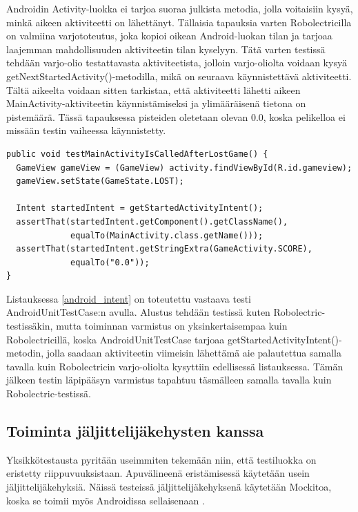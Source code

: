 Androidin Activity-luokka ei tarjoa suoraa julkista metodia, jolla voitaisiin kysyä, minkä aikeen aktiviteetti on lähettänyt. Tällaisia tapauksia varten Robolectricilla on valmiina varjototeutus, joka kopioi oikean Android-luokan tilan ja tarjoaa laajemman mahdollisuuden aktiviteetin tilan kyselyyn. Tätä varten testissä tehdään varjo-olio testattavasta aktiviteetista, jolloin varjo-oliolta voidaan kysyä getNextStartedActivity()-metodilla, mikä on seuraava käynnistettävä aktiviteetti. Tältä aikeelta voidaan sitten tarkistaa, että aktiviteetti lähetti aikeen MainActivity-aktiviteetin käynnistämiseksi ja ylimääräisenä tietona on pistemäärä. Tässä tapauksessa pisteiden oletetaan olevan 0.0, koska pelikelloa ei missään testin vaiheessa käynnistetty.

\begin{lstlisting}[float,label=android_intent,caption=Aikeen tilatietojen tarkastelu ActivityUnitTestCasen avulla]
public void testMainActivityIsCalledAfterLostGame() {
  GameView gameView = (GameView) activity.findViewById(R.id.gameview);
  gameView.setState(GameState.LOST);
  	
  Intent startedIntent = getStartedActivityIntent();
  assertThat(startedIntent.getComponent().getClassName(), 
             equalTo(MainActivity.class.getName()));
  assertThat(startedIntent.getStringExtra(GameActivity.SCORE), 
             equalTo("0.0"));
}
\end{lstlisting}

Listauksessa \ref{android_intent} on toteutettu vastaava testi AndroidUnitTestCase:n avulla. Alustus tehdään testissä kuten Robolectric-testissäkin, mutta toiminnan varmistus on yksinkertaisempaa kuin Robolectricillä, koska AndroidUnitTestCase tarjoaa getStartedActivityIntent()-metodin, jolla saadaan aktiviteetin viimeisin lähettämä aie palautettua samalla tavalla kuin Robolectricin varjo-oliolta kysyttiin edellisessä listauksessa. Tämän jälkeen testin läpipääsyn varmistus tapahtuu täsmälleen samalla tavalla kuin Robolectric-testissä.

\subsection{Toiminta jäljittelijäkehysten kanssa}

Yksikkötestausta pyritään useimmiten tekemään niin, että testiluokka on eristetty riippuvuuksistaan. Apuvälineenä eristämisessä käytetään usein jäljittelijäkehyksiä. Näissä testeissä jäljittelijäkehyksenä käytetään Mockitoa, koska se toimii myös Androidissa sellaisenaan \cite{mockito}.

